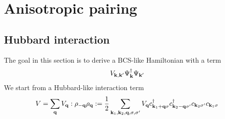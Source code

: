 \documentclass[../main.tex]{subfiles}
\begin{document}
\section{Anisotropic pairing}

\subsection{Hubbard interaction}

The goal in this section is to derive a BCS-like Hamiltonian with a term
\begin{equation}
    V_{\bm{\mathrm{k}}, \bm{\mathrm{k}}^{\prime}} \Psi^{\dagger}_{\bm{\mathrm{k}}} \Psi_{\bm{\mathrm{k}}^{\prime}}
\end{equation}
We start from a Hubbard-like interaction term
\begin{equation}
    V = \sum_{\bm{\mathrm{q}}} V_{\bm{\mathrm{q}}} : \rho_{-\bm{\mathrm{q}}} \rho_{\bm{\mathrm{q}}} : = \frac{1}{2} \sum_{\bm{\mathrm{k}}_1, \bm{\mathrm{k}}_2, \bm{\mathrm{q}}, \sigma, \sigma^{\prime}} V_{\bm{\mathrm{q}}} c_{\bm{\mathrm{k}}_1 + \bm{\mathrm{q}} \sigma}^{\dagger} c_{\bm{\mathrm{k}}_2 - \bm{\mathrm{q}} \sigma^{\prime}}^{\dagger} c_{\bm{\mathrm{k}}_2 \sigma^{\prime}} c_{\bm{\mathrm{k}}_1 \sigma}
\end{equation}
\end{document}
